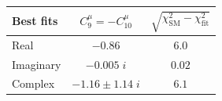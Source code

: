\documentclass[mathserif, 10pt]{beamer}
\begin{document}
\begin{frame}
    ~

    \begin{table}
        \centering
        \begin{tabular}{|l|c|c|}\hline
            \textbf{Best fits} & $C_9^\mu=-C_{10}^\mu$ & $\sqrt{\chi^2_\mathrm{SM} - \chi^2_\mathrm{fit}}$ \\\hline
            Real               & $ -0.86$              & $6.0 $                                            \\\hline
            Imaginary          & $-0.005\;i $          & $0.02 $                                           \\\hline
            Complex            & $-1.16\pm 1.14\;i$    & $6.1$                                             \\\hline
        \end{tabular}
    \end{table}
\end{frame}
\end{document}
